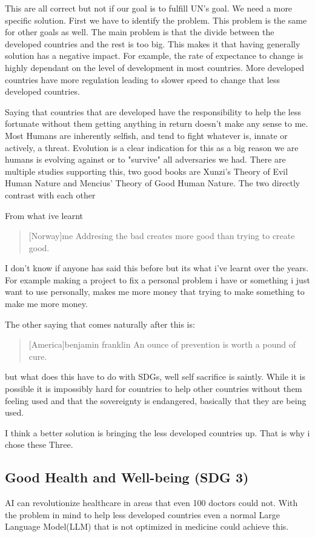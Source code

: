 This are all correct but not if our goal is to fulfill UN's goal. We need a more specific solution. First we have to identify the problem. This problem is the same for other goals as well. The main problem is that the divide between the developed countries and the rest is too big. This makes it that having generally solution has a negative impact. For example, the rate of expectance to change is highly dependant on the level of development in most countries. More developed countries have more regulation leading to slower speed to change that less developed countries.

Saying that countries that are developed have the responsibility to help the less fortunate without them getting anything in return doesn't make any sense to me. Most Humans are inherently selfish, and tend to fight whatever is, innate or actively, a threat. Evolution is a clear indication for this as a big reason we are humans is evolving against or to "survive" all adversaries we had. There are multiple studies supporting this, two good books are  Xunzi's Theory of Evil Human Nature and Mencius' Theory of Good Human Nature. The two directly contrast with each other 

From what ive learnt
\begin{quote}[Norway]{me}
    Addresing the bad creates more good than trying to create good.
\end{quote}

I don't know if anyone has said this before but its what i've learnt over the years. For example making a project to fix a personal problem i have or something i just want to use personally, makes me more money that trying to make something to make me more money.

The other saying that comes naturally after this is: 

\begin{quote}[America]{benjamin franklin\cite{Benjamin_Franklin}}
    An ounce of prevention is worth a pound of cure.
\end{quote}

but what does this have to do with SDGs, well self sacrifice is saintly. While it is possible it is impossibly hard for countries to help other countries without them feeling used and that the sovereignty is endangered, basically that they are being used.

I think a better solution is bringing the less developed countries up. That is why i chose these Three.

\subsection{Good Health and Well-being (SDG 3)}
AI can revolutionize healthcare in areas that even 100 doctors could not. With the problem in mind to help less developed countries even a normal Large Language Model(LLM) that is not optimized in medicine could achieve this. 

